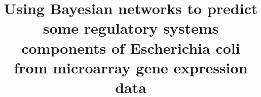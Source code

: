 \documentclass{bmcart}
\begin{document}
\begin{frontmatter}

\begin{fmbox}


\title{Using Bayesian networks to predict some regulatory systems components of Escherichia coli from microarray gene expression data}


\author[
   addressref={univalle},                   %
   corref={univalle},                       %
   email={digarjim@hotmail.com}   %
]{ }
\author[
   addressref={univalle},
   email={irenetischer@gmail.com}
]{ }


\address[id=univalle]{%
  , %
  ,                     %
  ,                              %
}


\end{fmbox}
\end{frontmatter}
\end{document}
